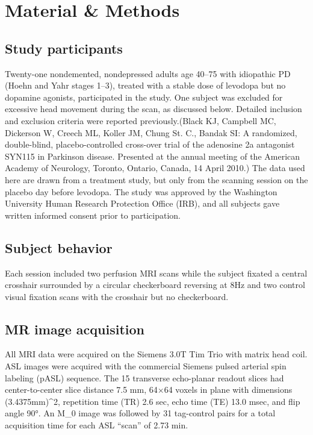 \section{Material \& Methods}

\subsection{Study participants}
Twenty-one nondemented, nondepressed adults age 40–75 with idiopathic PD (Hoehn and Yahr stages 1–3),\cite{6067254} treated with a stable dose of levodopa but no dopamine agonists, participated in the study. One subject was excluded for excessive head movement during the scan, as discussed below. Detailed inclusion and exclusion criteria were reported previously.(Black KJ, Campbell MC, Dickerson W, Creech ML, Koller JM, Chung St. C., Bandak SI: A randomized, double-blind, placebo-controlled cross-over trial of the adenosine 2a antagonist SYN115 in Parkinson disease. Presented at the annual meeting of the American Academy of Neurology, Toronto, Ontario, Canada, 14 April 2010.) The data used here are drawn from a treatment study,\cite{Black_2010} but only from the scanning session on the placebo day before levodopa. The study was approved by the Washington University Human Research Protection Office (IRB), and all subjects gave written informed consent prior to participation.  

\subsection{Subject behavior}
Each session included two perfusion MRI scans while the subject fixated a central crosshair surrounded by a circular checkerboard reversing at 8Hz and two control visual fixation scans with the crosshair but no checkerboard. 

\subsection{MR image acquisition}
All MRI data were acquired on the Siemens 3.0T Tim Trio with matrix head coil. ASL images were acquired with the commercial Siemens pulsed arterial spin labeling (pASL) sequence.\cite{Wang_2003} The 15 transverse echo-planar readout slices had center-to-center slice distance 7.5 mm, 64$\times$64 voxels in plane with dimensions (3.4375mm)^2, repetition time (TR) 2.6 sec, echo time (TE) 13.0 msec, and flip angle 90°. An M_0 image was followed by 31 tag-control pairs for a total acquisition time for each ASL ``scan'' of 2.73 min.

